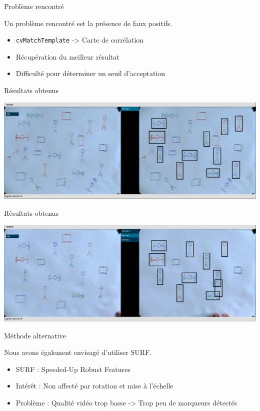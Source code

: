 \documentclass[t,14pt]{beamer}
\begin{document}
\begin{frame}{Problème rencontré}
\vspace{5mm}
\begin{block}{}
Un problème rencontré est la présence de faux positifs.
\end{block}
\begin{itemize}
\item \texttt{cvMatchTemplate} -> Carte de corrélation
\item Récupération du meilleur résultat
\item Difficulté pour déterminer un seuil d'acceptation
\end{itemize}
\end{frame}	

\begin{frame}{Résultats obtenus}
\vspace{5mm}
\begin{center}
\includegraphics[width=\textwidth]{images/capture1.png}
\end{center}
\end{frame}

\begin{frame}{Résultats obtenus}
\vspace{5mm}
\begin{center}
\includegraphics[width=\textwidth]{images/capture2.png}
\end{center}
\end{frame}

\begin{frame}{Méthode alternative}
\vspace{5mm}
\begin{block}{}
Nous avons également envisagé d'utiliser SURF.
\end{block}
\begin{itemize}
\item SURF : Speeded-Up Robust Features
\item Intérêt : Non affecté par rotation et mise à l'échelle 
\item Problème : Qualité vidéo trop basse -> Trop peu de marqueurs détectés
\end{itemize}
\end{frame}
\end{document}
